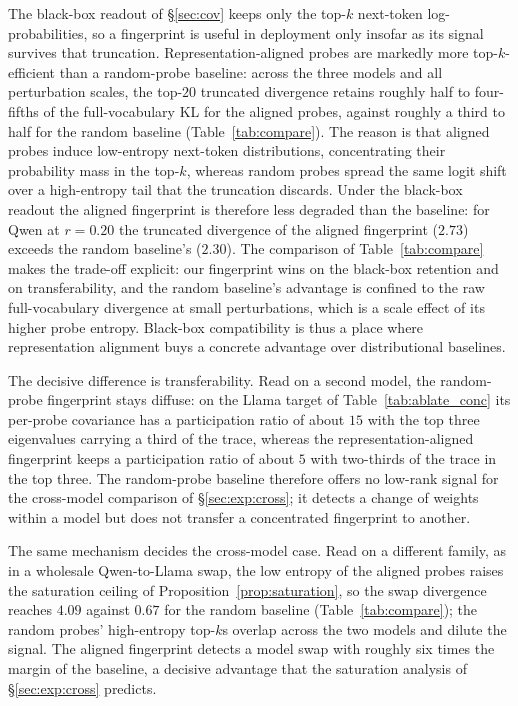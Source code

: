\documentclass[11pt]{article}
\theoremstyle{definition}
\begin{document}
The black-box readout of \S\ref{sec:cov} keeps only the top-$k$ next-token
log-probabilities, so a fingerprint is useful in deployment only insofar as its
signal survives that truncation. Representation-aligned probes are markedly more
top-$k$-efficient than a random-probe baseline: across the three models and all
perturbation scales, the top-$20$ truncated divergence retains roughly half to
four-fifths of the full-vocabulary KL for the aligned probes, against roughly a
third to half for the random baseline (Table~\ref{tab:compare}). The reason is
that aligned probes induce low-entropy next-token distributions, concentrating
their probability mass in the top-$k$, whereas random probes spread the same
logit shift over a high-entropy tail that the truncation discards. Under the
black-box readout the aligned fingerprint is therefore less degraded than the
baseline: for Qwen at $r=0.20$ the truncated divergence of the aligned
fingerprint ($2.73$) exceeds the random baseline's ($2.30$). The comparison of
Table~\ref{tab:compare} makes the trade-off explicit: our fingerprint wins on
the black-box retention and on transferability, and the random baseline's
advantage is confined to the raw full-vocabulary divergence at small
perturbations, which is a scale effect of its higher probe entropy. Black-box
compatibility is thus a place where representation alignment buys a concrete
advantage over distributional baselines.

The decisive difference is transferability. Read on a second model, the
random-probe fingerprint stays diffuse: on the Llama target of
Table~\ref{tab:ablate_conc} its per-probe covariance has a participation ratio
of about $15$ with the top three eigenvalues carrying a third of the trace,
whereas the representation-aligned fingerprint keeps a participation ratio of
about $5$ with two-thirds of the trace in the top three. The random-probe
baseline therefore offers no low-rank signal for the cross-model comparison of
\S\ref{sec:exp:cross}; it detects a change of weights within a model but does
not transfer a concentrated fingerprint to another.

The same mechanism decides the cross-model case. Read on a different family, as
in a wholesale Qwen-to-Llama swap, the low entropy of the aligned probes raises
the saturation ceiling of Proposition~\ref{prop:saturation}, so the swap
divergence reaches $4.09$ against $0.67$ for the random baseline
(Table~\ref{tab:compare}); the random probes' high-entropy top-$k$s overlap
across the two models and dilute the signal. The aligned fingerprint detects a
model swap with roughly six times the margin of the baseline, a decisive
advantage that the saturation analysis of \S\ref{sec:exp:cross} predicts.
\end{document}

